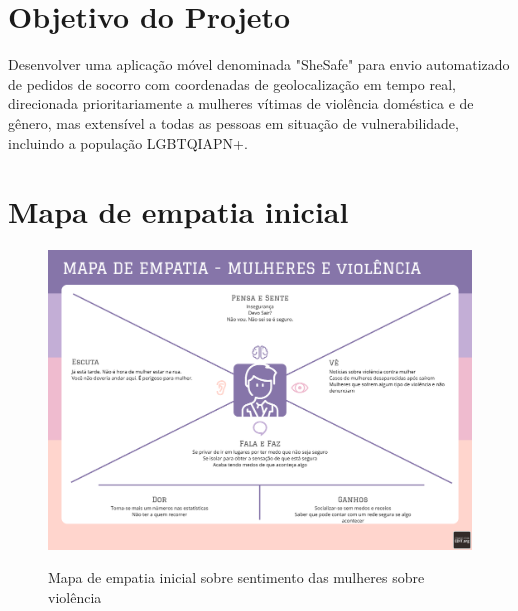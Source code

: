 \section{Objetivo do Projeto}
Desenvolver uma aplicação móvel denominada "SheSafe" para envio automatizado de pedidos de socorro com coordenadas de geolocalização em tempo real, direcionada prioritariamente a mulheres vítimas de violência doméstica e de gênero, mas extensível a todas as pessoas em situação de vulnerabilidade, incluindo a população LGBTQIAPN+.



\section{Mapa de empatia inicial}
\begin{figure}[htbp]
  \begin{center}
  \includegraphics[width=.9\linewidth]{images/mapa-empatia-inicial.png}\\
  \end{center}
  \caption[Mapa de empatia inicial]{Mapa de empatia inicial sobre sentimento das mulheres sobre violência}
  \label{fig:mapa-empatia-inicial}
\end{figure}
\pagebreak

